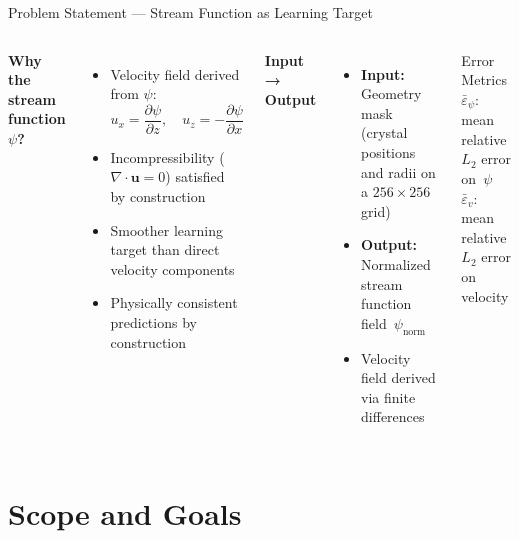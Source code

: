 \documentclass[aspectratio=169, 10pt]{beamer}
\begin{document}
\begin{frame}{Problem Statement — Stream Function as Learning Target}
  \begin{columns}[T]
      \textbf{Why the stream function $\psi$?}
      \begin{itemize}
        \item Velocity field derived from $\psi$:
        \[
          u_x = \frac{\partial\psi}{\partial z},\quad
          u_z = -\frac{\partial\psi}{\partial x}
        \]
        \item Incompressibility ($\nabla\!\cdot\!\mathbf{u}=0$) satisfied by construction
        \item Smoother learning target than direct velocity components
        \item Physically consistent predictions by construction
      \end{itemize}

      \textbf{Input → Output}
      \begin{itemize}
        \item \textbf{Input:} Geometry mask (crystal positions and radii on a $256\times256$ grid)
        \item \textbf{Output:} Normalized stream function field~$\psi_\text{norm}$
        \item Velocity field derived via finite differences
      \end{itemize}
      \vspace{0.4em}
      \begin{alertblock}{Error Metrics}
        $\bar{\varepsilon}_\psi$: mean relative $L_2$ error on~$\psi$\\
        $\bar{\varepsilon}_v$: mean relative $L_2$ error on velocity
      \end{alertblock}
  \end{columns}
\end{frame}

\section{Scope and Goals}
\end{document}
